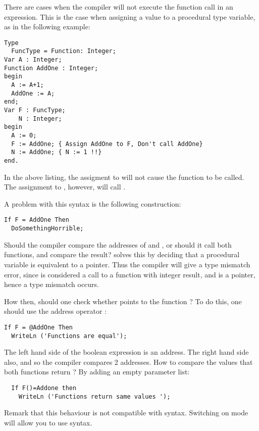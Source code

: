 There are cases when the compiler will not execute the function call in an
expression. This is the case when assigning a value to a procedural
type variable, as in the following example:
\begin{verbatim}
Type
  FuncType = Function: Integer;
Var A : Integer;
Function AddOne : Integer;
begin
  A := A+1;
  AddOne := A;
end;
Var F : FuncType;
    N : Integer;
begin
  A := 0;
  F := AddOne; { Assign AddOne to F, Don't call AddOne}
  N := AddOne; { N := 1 !!}
end.
\end{verbatim}
In the above listing, the assigment to  will not cause the function
 to be called. The assignment to , however, will call
. 

A problem with this syntax is the following construction:
\begin{verbatim}
If F = AddOne Then
  DoSomethingHorrible;
\end{verbatim}
Should the compiler compare the addresses of  and ,
or should it call both functions, and compare the result? \fpc solves this
by deciding that a procedural variable is equivalent to a pointer. Thus the
compiler will give a type mismatch error, since  is considered a
call to a function with integer result, and  is a pointer, hence a type
mismatch occurs.

How then, should one check whether  points to the function
? To do this, one should use the address operator :
\begin{verbatim}
If F = @AddOne Then
  WriteLn ('Functions are equal');
\end{verbatim}
The left hand side of the boolean expression is an address. The right hand
side also, and so the compiler compares 2 addresses.
How to compare the values that both functions return ? By adding an empty
parameter list:
\begin{verbatim}
  If F()=Addone then
    WriteLn ('Functions return same values ');
\end{verbatim}
Remark that this behaviour is not compatible with \delphi syntax. 
Switching on  mode will allow you to use \delphi syntax.

